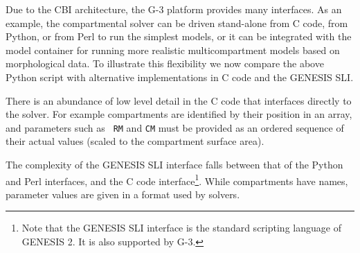 \documentclass[12pt]{article}
\begin{document}
Due to the CBI architecture, the G-3 platform provides many interfaces.
As an example, the compartmental solver can be driven stand-alone from
C code, from Python, or from Perl to run the simplest models, or it
can be integrated with the model container for running more realistic
multicompartment models based on morphological data.  To illustrate
this flexibility we now compare the above Python script with
alternative implementations in C code and the GENESIS SLI.

There is an abundance of low level detail in the C code that
interfaces directly to the solver.  For example compartments are
identified by their position in an array, and parameters such as {\tt
  RM} and {\tt CM} must be provided as an ordered sequence of their
actual values (scaled to the compartment surface area).

The complexity of the GENESIS SLI interface falls between that of the
Python and Perl interfaces, and the C code interface\footnote{Note
  that the GENESIS SLI interface is the standard scripting language of
  GENESIS 2. It is also supported by G-3.}.  While compartments have
names, parameter values are given in a format used by solvers.
\end{document}
